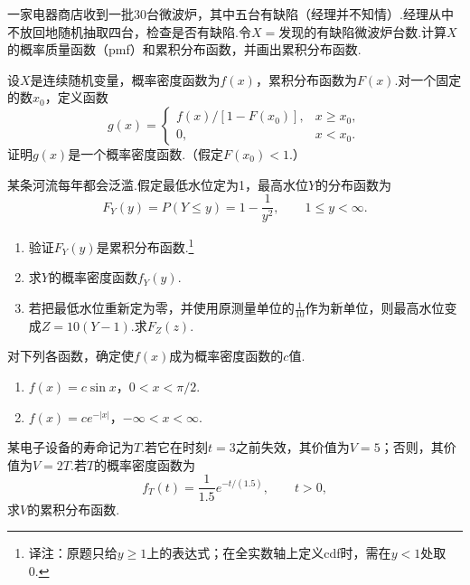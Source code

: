 \begin{exercise}\label{exercise:1.51}
一家电器商店收到一批30台微波炉，其中五台有缺陷（经理并不知情）.经理从中不放回地随机抽取四台，检查是否有缺陷.令$X=$发现的有缺陷微波炉台数.计算$X$的概率质量函数（pmf）和累积分布函数，并画出累积分布函数.
\end{exercise}

\begin{exercise}\label{exercise:1.52}
设$X$是连续随机变量，概率密度函数为$f(x)$，累积分布函数为$F(x)$.对一个固定的数$x_0$，定义函数
$$
g(x)=\begin{cases}
f(x)/[1-F(x_0)],&x\ge x_0,\\
0,&x<x_0.
\end{cases}
$$
证明$g(x)$是一个概率密度函数.（假定$F(x_0)<1$.）
\end{exercise}



\begin{exercise}\label{exercise:1.53}
某条河流每年都会泛滥.假定最低水位定为1，最高水位$Y$的分布函数为
$$
F_Y(y)=P(Y\le y)=1-\frac1{y^2},\qquad 1\le y<\infty.
$$
\begin{enumerate}
\item[(a)] 验证$F_Y(y)$是累积分布函数.\footnote{译注：原题只给$y\ge1$上的表达式；在全实数轴上定义cdf时，需在$y<1$处取0.}
\item[(b)] 求$Y$的概率密度函数$f_Y(y)$.
\item[(c)] 若把最低水位重新定为零，并使用原测量单位的$\frac1{10}$作为新单位，则最高水位变成$Z=10(Y-1)$.求$F_Z(z)$.
\end{enumerate}
\end{exercise}

\begin{exercise}\label{exercise:1.54}
对下列各函数，确定使$f(x)$成为概率密度函数的$c$值.
\begin{enumerate}
\item[(a)] $f(x)=c\sin x$，$0<x<\pi/2$.
\item[(b)] $f(x)=ce^{-|x|}$，$-\infty<x<\infty$.
\end{enumerate}
\end{exercise}

\begin{exercise}\label{exercise:1.55}
某电子设备的寿命记为$T$.若它在时刻$t=3$之前失效，其价值为$V=5$；否则，其价值为$V=2T$.若$T$的概率密度函数为
$$
f_T(t)=\frac1{1.5}e^{-t/(1.5)},\qquad t>0,
$$
求$V$的累积分布函数.
\end{exercise}

